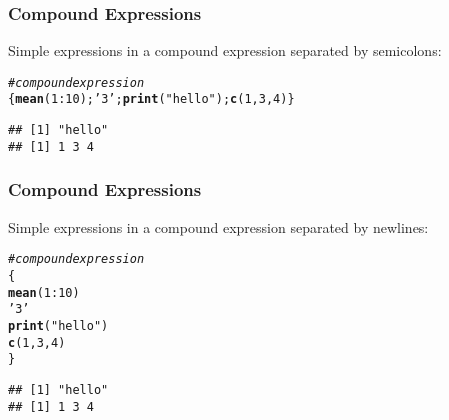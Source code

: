 \documentclass[12pt]{beamer}\usepackage[]{graphicx}\usepackage[]{color}
\makeatletter
\newcommand{\hlnum}[1]{\textcolor[rgb]{0.686,0.059,0.569}{#1}}%
\newcommand{\hlstr}[1]{\textcolor[rgb]{0.192,0.494,0.8}{#1}}%
\newcommand{\hlcom}[1]{\textcolor[rgb]{0.678,0.584,0.686}{\textit{#1}}}%
\newcommand{\hlopt}[1]{\textcolor[rgb]{0,0,0}{#1}}%
\newcommand{\hlstd}[1]{\textcolor[rgb]{0.345,0.345,0.345}{#1}}%
\newcommand{\hlkwd}[1]{\textcolor[rgb]{0.737,0.353,0.396}{\textbf{#1}}}%
\newenvironment{kframe}{%
 \def\at@end@of@kframe{}%
 \ifinner\ifhmode%
  \def\at@end@of@kframe{\end{minipage}}%
  \begin{minipage}{\columnwidth}%
 \fi\fi%
 \def\FrameCommand##1{\hskip\@totalleftmargin \hskip-\fboxsep
 \colorbox{shadecolor}{##1}\hskip-\fboxsep
     \hskip-\linewidth \hskip-\@totalleftmargin \hskip\columnwidth}%
 \MakeFramed {\advance\hsize-\width
   \@totalleftmargin\z@ \linewidth\hsize
   \@setminipage}}%
 {\par\unskip\endMakeFramed%
 \at@end@of@kframe}
\newenvironment{knitrout}{}{} %
\makeatother
\begin{document}

\begin{frame}[fragile]
\frametitle{Compound Expressions}

Simple expressions in a compound expression separated by semicolons:
\begin{knitrout}\footnotesize
{}\color{fgcolor}\begin{kframe}
\begin{alltt}
\hlcom{# compound expression}
\hlstd{\{}\hlkwd{mean}\hlstd{(}\hlnum{1}\hlopt{:}\hlnum{10}\hlstd{);} \hlstr{'3'}\hlstd{;} \hlkwd{print}\hlstd{(}\hlstr{"hello"}\hlstd{);} \hlkwd{c}\hlstd{(}\hlnum{1}\hlstd{,} \hlnum{3}\hlstd{,} \hlnum{4}\hlstd{)\}}
\end{alltt}
\begin{verbatim}
## [1] "hello"
## [1] 1 3 4
\end{verbatim}
\end{kframe}
\end{knitrout}

\end{frame}


\begin{frame}[fragile]
\frametitle{Compound Expressions}

Simple expressions in a compound expression separated by newlines:
\begin{knitrout}\footnotesize
{}\color{fgcolor}\begin{kframe}
\begin{alltt}
\hlcom{# compound expression}
\hlstd{\{}
  \hlkwd{mean}\hlstd{(}\hlnum{1}\hlopt{:}\hlnum{10}\hlstd{)}
  \hlstr{'3'}
  \hlkwd{print}\hlstd{(}\hlstr{"hello"}\hlstd{)}
  \hlkwd{c}\hlstd{(}\hlnum{1}\hlstd{,} \hlnum{3}\hlstd{,} \hlnum{4}\hlstd{)}
\hlstd{\}}
\end{alltt}
\begin{verbatim}
## [1] "hello"
## [1] 1 3 4
\end{verbatim}
\end{kframe}
\end{knitrout}

\end{frame}

\end{document}
